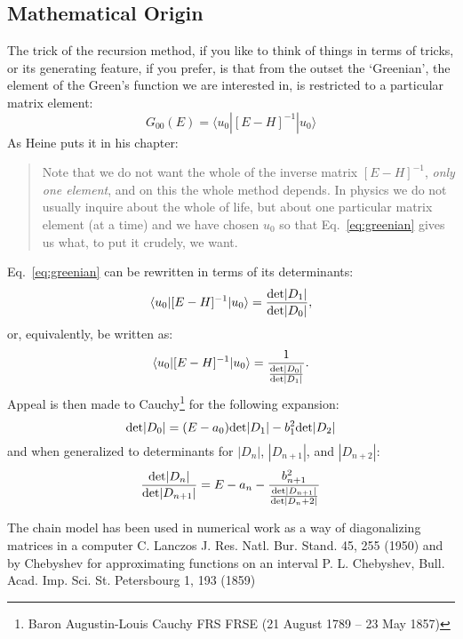 \documentclass{article}
\def\ket{\rangle}
\def\bra{\langle}
\begin{document}
\subsection{Mathematical Origin}
The trick of the recursion method, if you like to think of things in terms of tricks, 
or its generating feature, if you prefer, is that from the outset the `Greenian', the element
of the Green's function we are interested in, is restricted to a particular matrix element: 
%
\begin{equation}
\label{eq:greenian}
G_{00}(E) = \bra u_{0}|[E-H]^{-1}|u_{0}\ket 
\end{equation}
%
As Heine puts it in his chapter:
%
\begin{quote}
Note that we do not want the whole of the inverse matrix $[E-H]^{-1}$, 
\emph{only one element}, and on this the whole method depends. In physics we do not
usually inquire about the whole of life, but about one particular matrix element (at a time) and we have chosen
$u_{0}$ so that Eq.~\ref{eq:greenian} gives us what, to put it crudely, we want.
\end{quote}

Eq.~\ref{eq:greenian} can be rewritten in terms of its determinants:
%
\begin{equation}
\label{eq:greendet}
\bra u_{0}|[E-H]^{-1}|u_{0}\ket = \frac{{\rm det}|D_{1}|}{{\rm det}|D_{0}|},
\end{equation}
%
or, equivalently, be written as:
%
\begin{equation}
\label{eq:greendet}
\bra u_{0}|[E-H]^{-1}|u_{0}\ket = \frac{1}{\frac{{\rm det}|D_{0}|}{{\rm det}|D_{1}|}}.
\end{equation}
%
Appeal is then made to Cauchy\footnote{Baron Augustin-Louis Cauchy FRS FRSE (21 August 1789 – 23 May 1857)} 
for the following expansion:
%
\begin{equation}
{\rm det}|D_{0}| = (E-a_{0}){\rm det}|D_{1}| - b^{2}_{1}{\rm det}|D_{2}|
\end{equation}
%
and when generalized to determinants for $|D_{n}|$, $|D_{n+1}|$, and $|D_{n+2}|$:
%
\begin{equation}
\frac{{\rm det}|D_{n}|}{{\rm det}|D_{n+1}|} = E -a_{n} - \frac{b^{2}_{n+1}}{\frac{{\rm det}|D_{n+1}|}{{\rm det}|D_n+2|}}
\end{equation}

The chain model has been used in numerical work as a way of diagonalizing matrices in a computer 
C. Lanczos J. Res. Natl. Bur. Stand. 45, 255 (1950) and
by Chebyshev for approximating functions on an interval
P. L. Chebyshev, Bull. Acad. Imp. Sci. St. Petersbourg 1, 193 (1859)
\end{document}
